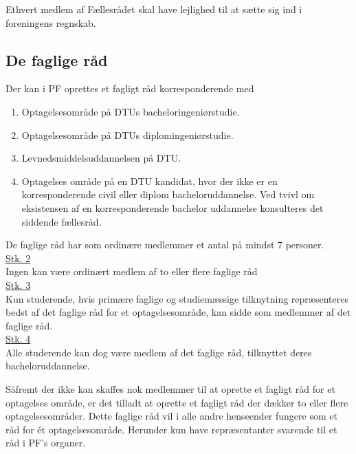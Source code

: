 \begin{list}
\item Ethvert medlem af Fællesrådet skal have lejlighed til at sætte sig ind i foreningens regnskab.


\subsection{De faglige råd}
\label{L:kap:Faglige}

\item Der kan i PF oprettes et fagligt råd korresponderende med
	\begin{enumerate}
	\item Optagelsesområde på DTUs bacheloringeniørstudie.
	\item Optagelsesområde på DTUs diplomingeniørstudie.
	\item Levnedsmiddelsuddannelsen på DTU.
	\item Optagelses område på en DTU kandidat, hvor der ikke er en korresponderende civil eller diplom bacheloruddannelse. Ved tvivl om eksistensen af en korresponderende bachelor uddannelse konsulteres det siddende fællesråd.
	\end{enumerate}     
    
\item De faglige råd har som ordinære medlemmer et antal på mindst 7 personer.\\

\underline{Stk. 2} \\
Ingen kan være ordinært medlem af to eller flere faglige råd\\

\underline{Stk. 3} \\
Kun studerende, hvis primære faglige og studiemæssige tilknytning repræsenteres bedst af det faglige råd for et optagelsesområde, kan sidde som medlemmer af det faglige råd.\\

\underline{Stk. 4} \\ 
Alle studerende kan dog være medlem af det faglige råd, tilknyttet deres bacheloruddannelse.\\

\item Såfremt der ikke kan skaffes nok medlemmer til at oprette et fagligt råd for et optagelses område, er det tilladt at oprette et fagligt råd der dækker to eller flere optagelsesområder. Dette faglige råd vil i alle andre henseender fungere som et råd for ét optagelsesområde. Herunder kun have repræsentanter svarende til et råd i PF’s organer.\\


\end{list}
